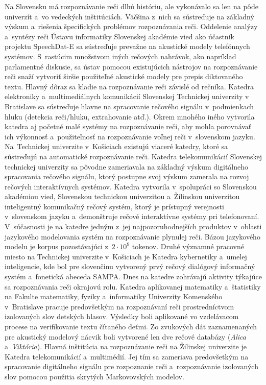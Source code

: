 Na Slovensku má rozpoznávanie reči dlhú históriu, ale vykonávalo sa len na pôde univerzít a~vo vedeckých inštitúciách. Väčšina z~nich sa sústreďuje na základný výskum a~riešenia špecifických problémov rozpoznávania reči. Oddelenie analýzy a~syntézy reči Ústavu informatiky Slovenskej akadémie vied ako účastník projektu SpeechDat-E sa sústreďuje prevažne na akustické modely telefónnych systémov. S~rastúcim množstvom iných rečových nahrávok, ako napríklad parlamentné diskusie, sa ústav pomocou existujúcich nástrojov na rozpoznávanie reči snaží vytvoriť širšie použiteľné akustické modely pre  prepis diktovaného textu. Hlavný dôraz sa kladie na rozpoznávanie reči závislé od rečníka. Katedra elektroniky a~multimediálnych komunikácií Slovenskej Technickej univerzity v Bratislave sa sústreďuje hlavne na spracovanie rečového signálu v~podmienkach hluku (detekcia reči/hluku, extrahovanie atď.). Okrem mnohého iného vytvorila katedra aj početné malé systémy na rozpoznávanie reči, aby mohla porovnávať ich výkonnosť a~použiteľnosť na rozpoznávanie voľnej reči v~slovenskom jazyku. Na~Technickej univerzite v~Košiciach existujú viaceré katedry, ktoré sa sústreďujú na automatické rozpoznávanie reči. Katedra telekomunikácií Slovenskej technickej univerzity sa pôvodne zameriavala na základný výskum digitálneho spracovania rečového signálu, ktorý postupne svoj výskum zamerala na rozvoj rečových interaktívnych systémov.
\newline Katedra vytvorila v~spolupráci so Slovenskou akadémiou vied, Slovenskou technickou univerzitou a~Žilinskou univerzitou inteligentný komunikačný rečový systém, ktorý je prístupný verejnosti v~slovenskom jazyku a~demonštruje rečové interaktívne systémy pri telefonovaní. V~súčasnosti je na katedre jedným z~jej najpozoruhodnejších produktov v~oblasti jazykového modelovania systém na rozpoznávanie plynulej reči. Bázou jazykového modelu  je korpus pozostávajúci z~$2\cdot 10^9$ tokenov. 
\newline Druhé významné pracovné miesto na Technickej univerzite v~Košiciach je Katedra kybernetiky a~umelej inteligencie, kde bol pre slovenčinu vytvorený prvý rečový dialógový informačný systém a~fonetická abeceda SAMPA. Dnes na katedre zohrávajú aktivity týkajúce sa rozpoznávania reči okrajovú rolu. Katedra aplikovanej matematiky a~štatistiky na Fakulte matematiky, fyziky a~informatiky Univerzity Komenského v~Bratislave pracuje predovšetkým na rozpoznávaní reči prostredníctvom izolovaných slov detských hlasov. Výsledky boli aplikované vo vzdelávacom procese na verifikovanie textu čítaného deťmi. Zo zvukových dát zaznamenaných pre akustický modelový nácvik boli vytvorené len dve rečové databázy (\emph{Alica} a~\emph{Viktória}).  Hlavná inštitúcia na rozpoznávanie reči na Žilinskej univerzite je Katedra telekomunikácií a~multimédií. Jej tím sa zameriava predovšetkým na spracovanie digitálneho signálu pre rozpoznanie reči a~rozpoznávanie izolovaných slov pomocou použitia skrytých Markovovských modelov.

